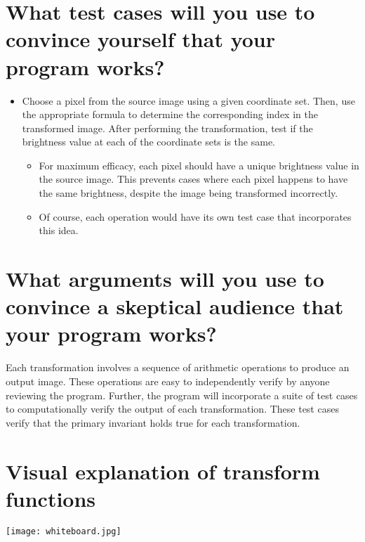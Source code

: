 \documentclass[12pt, letterpaper]{article}
\begin{document}
\section*{What test cases will you use to convince yourself that your program works?}

\begin{itemize}
    \item Choose a pixel from the source image using a given coordinate set. Then, use the appropriate formula to determine the corresponding index in the transformed image.
    After performing the transformation, test if the brightness value at each of the coordinate sets is the same.
    \begin{itemize}
        \item For maximum efficacy, each pixel should have a unique brightness value in the source image.
        This prevents cases where each pixel happens to have the same brightness, despite the image being transformed incorrectly.
        \item Of course, each operation would have its own test case that incorporates this idea.
    \end{itemize}
\end{itemize}

\section*{What arguments will you use to convince a skeptical audience that your program works?}

Each transformation involves a sequence of arithmetic operations to produce an output image.
These operations are easy to independently verify by anyone reviewing the program.
Further, the program will incorporate a suite of test cases to computationally verify the output of each transformation.
These test cases verify that the primary invariant holds true for each transformation.

\section*{Visual explanation of transform functions}
\texttt{[image: whiteboard.jpg]}
\end{document}
